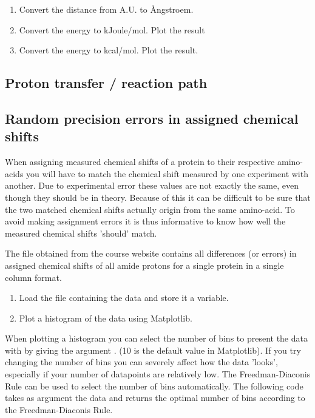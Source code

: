 \documentclass{article}
\begin{document}
\begin{enumerate}

    \item Convert the distance from A.U. to \AA ngstroem.

    \item Convert the energy to kJoule/mol. Plot the result

    \item Convert the energy to kcal/mol. Plot the result.

\end{enumerate}



\subsection{Proton transfer / reaction path}



\subsection{Random precision errors in assigned chemical shifts}

When assigning measured chemical shifts of a protein to their respective amino-acids you will have to match the chemical shift measured by one experiment with another.
Due to experimental error these values are not exactly the same, even though they should be in theory.
Because of this it can be difficult to be sure that the two matched chemical shifts actually origin from the same amino-acid.
To avoid making assignment errors it is thus informative to know how well the measured chemical shifts 'should' match.

The file  obtained from the course website contains all differences (or errors) in assigned chemical shifts of all amide protons for a single protein in a single column format.


\begin{enumerate}[resume]

    \item Load the file containing the data and store it a variable.

    \item Plot a histogram of the data using Matplotlib.

\end{enumerate}

When plotting a histogram you can select the number of bins to present the data with by giving the argument . (10 is the default value in Matplotlib).
If you try changing the number of bins you can severely affect how the data 'looks', especially if your number of datapoints are relatively low.
The Freedman-Diaconis Rule can be used to select the number of bins automatically.
The following code takes as argument the data and returns the optimal number of bins according to the Freedman-Diaconis Rule.
\end{document}
